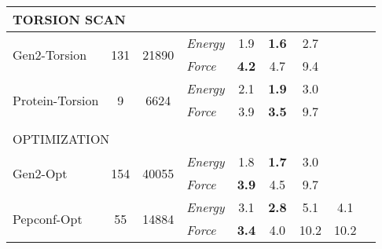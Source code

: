\documentclass[varwidth]{standalone}
\newcommand{\widthbetweentype}{7pt}
\begin{document}
\begin{adjustbox}{width=\textwidth,center}
\begin{tabular}{l c c l c c c c c}
\multicolumn{8}{l}{\small{TORSION SCAN}} \\\hline
\multirow{2}{*}{Gen2-Torsion} & \multirow{2}{*}{131} & \multirow{2}{*}{21890} & \textit{Energy} & 1.9 & \textbf{1.6} & 2.7 & \\
                                   &                       &                         & \textit{Force}  & \textbf{4.2} & 4.7 & 9.4 & \\
\hline
\multirow{2}{*}{Protein-Torsion} & \multirow{2}{*}{9} & \multirow{2}{*}{6624} & \textit{Energy} & 2.1 & \textbf{1.9} & 3.0 & \\
                                   &                       &                         & \textit{Force}  & 3.9 & \textbf{3.5} & 9.7 & \\
\hline
\multicolumn{8}{l}{\vspace{\widthbetweentype}} \\[-1em]
\multicolumn{8}{l}{\small{OPTIMIZATION}} \\\hline
\multirow{2}{*}{Gen2-Opt} & \multirow{2}{*}{154} & \multirow{2}{*}{40055} & \textit{Energy} & 1.8 & \textbf{1.7} & 3.0 & \\
                                   &                       &                         & \textit{Force}  & \textbf{3.9} & 4.5 & 9.7 & \\
\hline
\multirow{2}{*}{Pepconf-Opt} & \multirow{2}{*}{55} & \multirow{2}{*}{14884} & \textit{Energy} & 3.1 & \textbf{2.8} & 5.1 & 4.1\\
                                   &                       &                         & \textit{Force}  & \textbf{3.4} & 4.0 & 10.2 & 10.2\\
\hline
\hline
\hline
\end{tabular}

\end{adjustbox}
\end{document}
